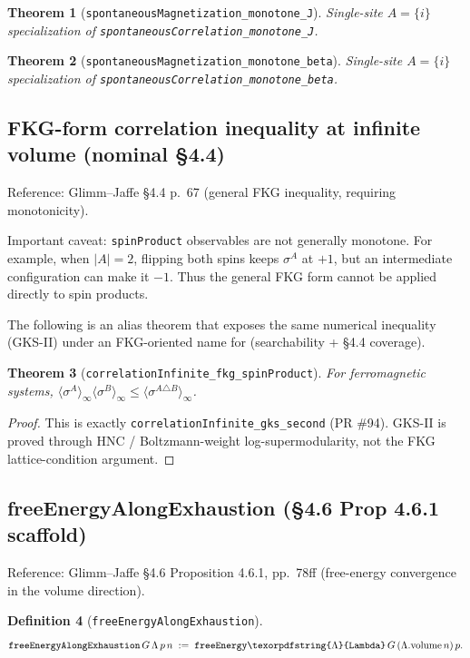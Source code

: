 \documentclass[a4paper,11pt]{article}
\newtheorem{theorem}{Theorem}
\newtheorem{definition}[theorem]{Definition}
\newcommand{\LeanLambda}{\texorpdfstring{\ensuremath{\Lambda}}{Lambda}}
\begin{document}
\begin{theorem}[\texttt{spontaneousMagnetization\_monotone\_J}]
Single-site $A = \{i\}$ specialization of
\texttt{spontaneousCorrelation\_monotone\_J}.
\end{theorem}

\begin{theorem}[\texttt{spontaneousMagnetization\_monotone\_beta}]
Single-site $A = \{i\}$ specialization of
\texttt{spontaneousCorrelation\_monotone\_beta}.
\end{theorem}

\subsection{FKG-form correlation inequality at infinite volume (nominal \S 4.4)}

Reference: Glimm--Jaffe \S 4.4 p.\ 67 (general FKG inequality, requiring
monotonicity).

Important caveat: \texttt{spinProduct} observables are not generally
monotone. For example, when $|A| = 2$, flipping both spins keeps
$\sigma^A$ at $+1$, but an intermediate configuration can make it $-1$.
Thus the general FKG form cannot be applied directly to spin products.

The following is an alias theorem that exposes the same numerical inequality
(GKS-II) under an FKG-oriented name for
(searchability + \S 4.4 coverage).

\begin{theorem}[\texttt{correlationInfinite\_fkg\_spinProduct}]
For ferromagnetic systems,
$\langle \sigma^A \rangle_\infty \langle \sigma^B \rangle_\infty
  \le \langle \sigma^{A \triangle B} \rangle_\infty$.
\end{theorem}

\begin{proof}
This is exactly \texttt{correlationInfinite\_gks\_second} (PR \#94).
GKS-II is proved through HNC / Boltzmann-weight log-supermodularity, not the
FKG lattice-condition argument.
\end{proof}

\subsection{freeEnergyAlongExhaustion (§4.6 Prop 4.6.1 scaffold)}

Reference: Glimm--Jaffe \S 4.6 Proposition 4.6.1, pp.\ 78ff
(free-energy convergence in the volume direction).

\begin{definition}[\texttt{freeEnergyAlongExhaustion}]
\[
\texttt{freeEnergyAlongExhaustion}\,G\,\Lambda\,p\,n
  \;:=\; \texttt{freeEnergy\LeanLambda}\,G\,(\Lambda.\text{volume}\,n)\,p.
\]
\end{definition}
\end{document}
